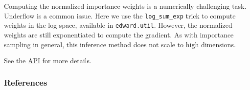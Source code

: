 Computing the normalized importance weights is a numerically
challenging task.  Underflow is a common issue. Here we use the
\texttt{log_sum_exp} trick to compute weights in the log space,
available in \texttt{edward.util}. However, the normalized weights are
still exponentiated to compute the gradient. As with importance
sampling in general, this inference method does not scale to high
dimensions.

See the \href{/api/}{API} for more details.

\subsubsection{References}\label{references}
